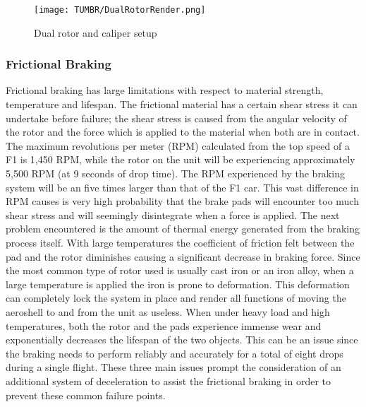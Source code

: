 \begin{figure}[H]
  \centering
  \texttt{[image: TUMBR/DualRotorRender.png]}
  \caption{\label{fig:dualrotor}Dual rotor and caliper setup}
\end{figure}

\subsubsection{Frictional Braking}

\indent\indent Frictional braking has large limitations with respect to material strength, temperature and lifespan. The frictional material has a certain shear stress it can undertake before failure; the shear stress is caused from the angular velocity of the rotor and the force which is applied to the material when both are in contact. The maximum revolutions per meter (RPM) calculated from the top speed of a F1 is 1,450 RPM, while the rotor on the unit will be experiencing  approximately 5,500 RPM (at 9 seconds of drop time). The RPM experienced by the braking system will be an five times larger than that of the F1 car. This vast difference in RPM causes is very high probability that the brake pads will encounter too much shear stress and will seemingly disintegrate when a force is applied. The next problem encountered is the amount of thermal energy generated from the braking process itself. With large temperatures the coefficient of friction felt between the pad and the rotor diminishes causing a significant decrease in braking force. Since the most common type of rotor used is usually cast iron or an iron alloy, when a large temperature is applied the iron is prone to deformation. This deformation can completely lock the system in place and render all functions of moving the aeroshell to and from the unit as useless. When under heavy load and high temperatures, both the rotor and the pads experience immense wear and exponentially decreases the lifespan of the two objects. This can be an issue since the braking needs to perform reliably and accurately for a total of eight drops during a single flight. These three main issues prompt the consideration of an additional system of deceleration to assist the frictional braking in order to prevent these common failure points.


